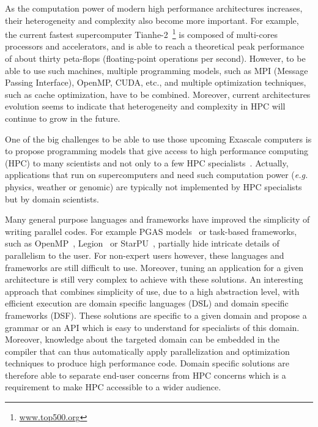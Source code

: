 As the computation power of modern high performance architectures increases, their heterogeneity and complexity also become more important. For example, the current fastest supercomputer Tianhe-2~\footnote{\url{www.top500.org}} is composed of multi-cores processors and accelerators, and is able to reach a theoretical peak performance of about thirty peta-flops (floating-point operations per second). However, to be able to use such machines, multiple programming models, such as MPI (Message Passing Interface), OpenMP, CUDA, etc., and multiple optimization techniques, such as cache optimization, have to be combined. Moreover, current architectures evolution seems to indicate that heterogeneity and complexity in HPC will continue to grow in the future.

One of the big challenges to be able to use those upcoming Exascale computers is to propose programming models that give access to high performance computing (HPC) to many scientists and not only to a few HPC specialists~\cite{ETP4HPC2013}. Actually, applications that run on supercomputers and need such computation power (\textit{e.g.} physics, weather or genomic) are typically not implemented by HPC specialists but by domain scientists.

Many general purpose languages and frameworks have improved the simplicity of writing parallel codes. For example PGAS models~\cite{Nieplocha:2006:AAP:1125980.1125985} or task-based frameworks, such as OpenMP~\cite{660313}, Legion~\cite{bauer:legion:sc:2012} or StarPU~\cite{Augonnet2011}, partially hide intricate details of parallelism to the user. For non-expert users however, these languages and frameworks are still difficult to use. Moreover, tuning an application for a given architecture is still very complex to achieve with these solutions.
An interesting approach that combines simplicity of use, due to a high abstraction level, with efficient execution are domain specific languages (DSL) and domain specific frameworks (DSF).
These solutions are specific to a given domain and propose a grammar or an API which is easy to understand for specialists of this domain.
Moreover, knowledge about the targeted domain can be embedded in the compiler that can thus automatically apply parallelization and optimization techniques to produce high performance code.
Domain specific solutions are therefore able to separate end-user concerns from HPC concerns which is a requirement to make HPC accessible to a wider audience.

